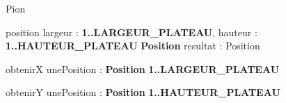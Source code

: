 \begin{algorithme}
	
	\begin{enregistrement}{Pion}
	\end{enregistrement}
	
	\vspace*{5mm} 
	
	\fonction
	{position}
	{largeur : \textbf{1..LARGEUR\_PLATEAU}, hauteur : \textbf{1..HAUTEUR\_PLATEAU}}
	{\textbf{Position}}
	{resultat : Position}
	{
		}
	
	\vspace*{5mm} 
	
	\fonction
	{obtenirX}
	{unePosition : \textbf{Position}}
	{\textbf{1..LARGEUR\_PLATEAU}}
	{}
	{}
	
	\vspace*{5mm} 
	
	\fonction
	{obtenirY}
	{unePosition : \textbf{Position}}
	{\textbf{1..HAUTEUR\_PLATEAU}}
	{}
	{}
	
	
\end{algorithme}

